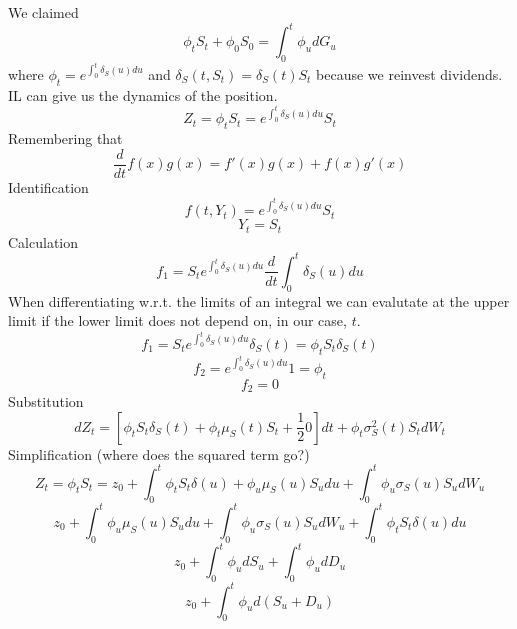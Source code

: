 We claimed
\[\phi_tS_t + \phi_0S_0=\int_0^t\phi_udG_u\]
where $\phi_t=e^{\int_0^t\delta_S(u)du}$ and $\delta_S(t, S_t)=\delta_S(t)S_t$
because we reinvest dividends.
IL can give us the dynamics of the position.
\[Z_t=\phi_tS_t=e^{\int_0^t\delta_S(u)du}S_t\]
Remembering that
\[\frac{d}{dt}f(x)g(x)=f'(x)g(x)+f(x)g'(x)\]
Identification
\[f(t, Y_t)=e^{\int_0^t\delta_S(u)du}S_t\]
\[Y_t=S_t\]
Calculation
\[f_1=S_te^{\int_0^t\delta_S(u)du}\frac{d}{dt}\int_0^t\delta_S(u)du\]
When differentiating w.r.t. the limits of an integral we can evalutate at the
upper limit if the lower limit does not depend on, in our case, $t$.
\[f_1=S_te^{\int_0^t\delta_S(u)du}\delta_S(t)=\phi_tS_t\delta_S(t)\]
\[f_2=e^{\int_0^t\delta_S(u)du}1=\phi_t\]
\[f_2=0\]
Substitution
\[
    dZ_t=\left[ \phi_tS_t\delta_S(t) + \phi_t\mu_S(t)S_t +\frac{1}{2}0  \right]
    dt + \phi_t\sigma_S^2(t)S_tdW_t
\]
Simplification (where does the squared term go?)
\[
    Z_t=\phi_tS_t=z_0+\int_0^t\phi_tS_t\delta(u)+
    \phi_u\mu_S(u)S_udu+\int_0^t\phi_u\sigma_S(u)S_udW_u
\]
\[
    z_0+\int_0^t\phi_u\mu_S(u)S_udu+
    \int_0^t\phi_u\sigma_S(u)S_udW_u+\int_0^t\phi_tS_t\delta(u)du
\]
\[z_0+\int_0^t\phi_udS_u+\int_0^t\phi_udD_u\]
\[z_0+\int_0^t\phi_ud(S_u+D_u)\]
